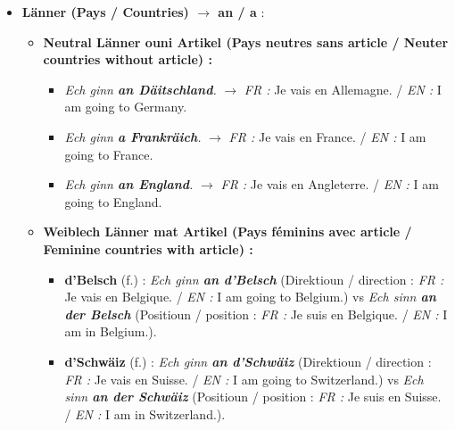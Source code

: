 \begin{itemize}
    \vspace{0.4em}

    \item \textbf{Länner (Pays / Countries) $\rightarrow$ an / a} :
    \begin{itemize}
        \item \textbf{Neutral Länner ouni Artikel (Pays neutres sans article / Neuter countries without article) :}
        \begin{itemize}
            \item \textit{Ech ginn \textbf{an Däitschland}.} $\rightarrow$ \textit{FR :} Je vais en Allemagne. / \textit{EN :} I am going to Germany.
            \item \textit{Ech ginn \textbf{a Frankräich}.} $\rightarrow$ \textit{FR :} Je vais en France. / \textit{EN :} I am going to France.
            \item \textit{Ech ginn \textbf{an England}.} $\rightarrow$ \textit{FR :} Je vais en Angleterre. / \textit{EN :} I am going to England.
        \end{itemize}
        \item \textbf{Weiblech Länner mat Artikel (Pays féminins avec article / Feminine countries with article) :}
        \begin{itemize}
            \item \textbf{d'Belsch} (f.) : \textit{Ech ginn \textbf{an d'Belsch}} (Direktioun / direction : \textit{FR :} Je vais en Belgique. / \textit{EN :} I am going to Belgium.) vs \textit{Ech sinn \textbf{an der Belsch}} (Positioun / position : \textit{FR :} Je suis en Belgique. / \textit{EN :} I am in Belgium.).
            \item \textbf{d'Schwäiz} (f.) : \textit{Ech ginn \textbf{an d'Schwäiz}} (Direktioun / direction : \textit{FR :} Je vais en Suisse. / \textit{EN :} I am going to Switzerland.) vs \textit{Ech sinn \textbf{an der Schwäiz}} (Positioun / position : \textit{FR :} Je suis en Suisse. / \textit{EN :} I am in Switzerland.).
        \end{itemize}
    \end{itemize}

    \vspace{0.4em}


\end{itemize}
